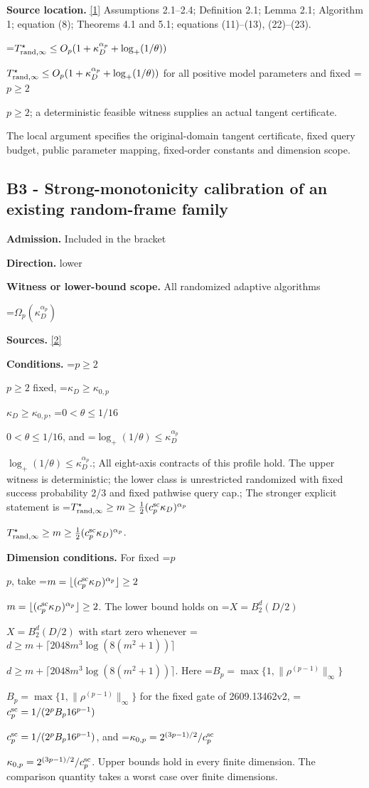 \documentclass[10pt,a4paper]{article}
\newcommand{\AtlasMath}[1]{\par\begingroup\centering\setbox0=\hbox{$\displaystyle #1$}\ifdim\wd0>1.4\linewidth\typeout{ATLAS WIDE FORMULA: \the\wd0}\fi\ifdim\wd0>\linewidth\resizebox{\linewidth}{!}{\box0}\else\box0\fi\par\endgroup}
\newcommand{\AtlasInlineMath}[1]{\begingroup\setbox0=\hbox{$#1$}\ifdim\wd0>.4\linewidth\endgroup\AtlasMath{#1}\else\endgroup$#1$\fi}
\begin{document}
\textbf{Source location.} \href{https://arxiv.org/pdf/2609.23557v1}{[1]} Assumptions 2.1--2.4; Definition 2.1; Lemma 2.1; Algorithm 1; equation (8); Theorems 4.1 and 5.1; equations (11)--(13), (22)--(23).



\AtlasInlineMath{T^\star_{{\rm rand},\infty}\le O_p(1+\kappa_D^{\alpha_p}+\log_+(1/\theta))} for all positive model parameters and fixed \AtlasInlineMath{p\ge2}; a deterministic feasible witness supplies an actual tangent certificate.



The local argument specifies the original-domain tangent certificate, fixed query budget, public parameter mapping, fixed-order constants and dimension scope.



\subsection{B3 - Strong-monotonicity calibration of an existing random-frame family}


\textbf{Admission.} Included in the bracket



\textbf{Direction.} lower



\textbf{Witness or lower-bound scope.} All randomized adaptive algorithms



\AtlasMath{\Omega_p(\kappa_D^{\alpha_p})}


\textbf{Sources.} \href{https://arxiv.org/pdf/2609.13462v2}{[2]}



\textbf{Conditions.} \AtlasInlineMath{p\ge2} fixed, \AtlasInlineMath{\kappa_D\ge\kappa_{0,p}}, \AtlasInlineMath{0<\theta\le1/16}, and \AtlasInlineMath{\log_+(1/\theta)\le\kappa_D^{\alpha_p}}.; All eight-axis contracts of this profile hold. The upper witness is deterministic; the lower class is unrestricted randomized with fixed success probability 2/3 and fixed pathwise query cap.; The stronger explicit statement is \AtlasInlineMath{T^\star_{{\rm rand},\infty}\ge m\ge\frac12(c_p^{\rm sc}\kappa_D)^{\alpha_p}}.



\textbf{Dimension conditions.} For fixed \AtlasInlineMath{p}, take \AtlasInlineMath{m=\lfloor(c_p^{\rm sc}\kappa_D)^{\alpha_p}\rfloor\ge2}. The lower bound holds on \AtlasInlineMath{X=B_2^d(D/2)} with start zero whenever \AtlasInlineMath{d\ge m+\lceil2048m^3\log(8(m^2+1))\rceil}. Here \AtlasInlineMath{B_p=\max\{1,\|\rho^{(p-1)}\|_\infty\}} for the fixed gate of 2609.13462v2, \AtlasInlineMath{c_p^{\rm sc}=1/(2^pB_p16^{p-1})}, and \AtlasInlineMath{\kappa_{0,p}=2^{(3p-1)/2}/c_p^{\rm sc}}. Upper bounds hold in every finite dimension. The comparison quantity takes a worst case over finite dimensions.
\end{document}
